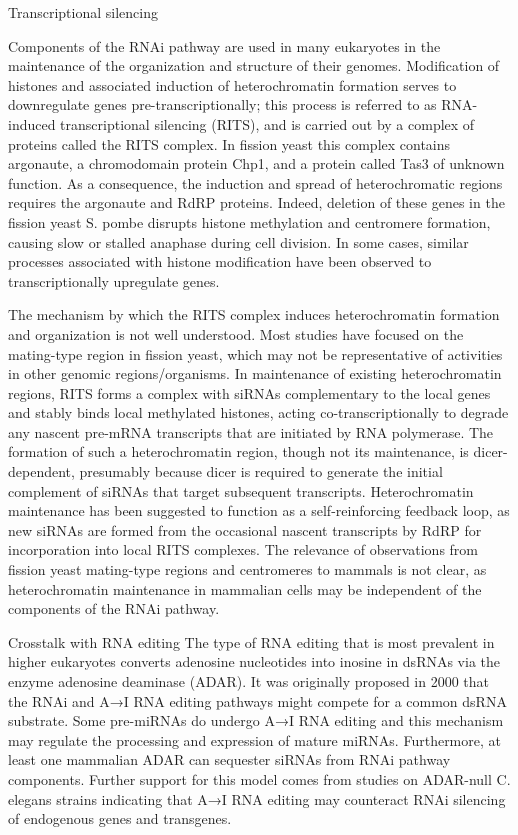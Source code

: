 Transcriptional silencing

Components of the RNAi pathway are used in many eukaryotes in the maintenance of the organization and structure of their genomes. Modification of histones and associated induction of heterochromatin formation serves to downregulate genes pre-transcriptionally; this process is referred to as RNA-induced transcriptional silencing (RITS), and is carried out by a complex of proteins called the RITS complex. In fission yeast this complex contains argonaute, a chromodomain protein Chp1, and a protein called Tas3 of unknown function. As a consequence, the induction and spread of heterochromatic regions requires the argonaute and RdRP proteins. Indeed, deletion of these genes in the fission yeast S. pombe disrupts histone methylation and centromere formation, causing slow or stalled anaphase during cell division. In some cases, similar processes associated with histone modification have been observed to transcriptionally upregulate genes.

The mechanism by which the RITS complex induces heterochromatin formation and organization is not well understood. Most studies have focused on the mating-type region in fission yeast, which may not be representative of activities in other genomic regions/organisms. In maintenance of existing heterochromatin regions, RITS forms a complex with siRNAs complementary to the local genes and stably binds local methylated histones, acting co-transcriptionally to degrade any nascent pre-mRNA transcripts that are initiated by RNA polymerase. The formation of such a heterochromatin region, though not its maintenance, is dicer-dependent, presumably because dicer is required to generate the initial complement of siRNAs that target subsequent transcripts. Heterochromatin maintenance has been suggested to function as a self-reinforcing feedback loop, as new siRNAs are formed from the occasional nascent transcripts by RdRP for incorporation into local RITS complexes. The relevance of observations from fission yeast mating-type regions and centromeres to mammals is not clear, as heterochromatin maintenance in mammalian cells may be independent of the components of the RNAi pathway.

Crosstalk with RNA editing
The type of RNA editing that is most prevalent in higher eukaryotes converts adenosine nucleotides into inosine in dsRNAs via the enzyme adenosine deaminase (ADAR). It was originally proposed in 2000 that the RNAi and A→I RNA editing pathways might compete for a common dsRNA substrate. Some pre-miRNAs do undergo A→I RNA editing and this mechanism may regulate the processing and expression of mature miRNAs. Furthermore, at least one mammalian ADAR can sequester siRNAs from RNAi pathway components. Further support for this model comes from studies on ADAR-null C. elegans strains indicating that A→I RNA editing may counteract RNAi silencing of endogenous genes and transgenes.

